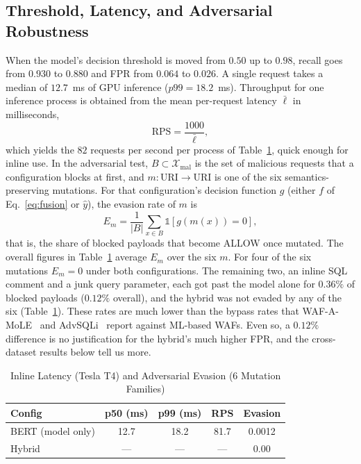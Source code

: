 \documentclass[conference]{IEEEtran}
\begin{document}
\subsection{Threshold, Latency, and Adversarial Robustness}
\label{sec:threshold}
When the model's decision threshold is moved from $0.50$ up to $0.98$,
recall goes from $0.930$ to $0.880$ and FPR from $0.064$ to $0.026$. A
single request takes a median of $12.7$~ms of GPU inference
($p99{=}18.2$~ms). Throughput for one inference process is obtained from
the mean per-request latency $\bar\ell$ in milliseconds,
\begin{equation}
\mathrm{RPS} = \frac{1000}{\bar\ell},
\label{eq:rps}
\end{equation}
which yields the $82$ requests per second per process of
Table~\ref{tab:latency}, quick enough for inline use. In the adversarial
test, $B\subset\mathcal{X}_{\text{mal}}$ is the set of malicious requests
that a configuration blocks at first, and $m:\text{URI}\to\text{URI}$ is
one of the six semantics-preserving mutations. For that configuration's
decision function $g$ (either $f$ of Eq.~\eqref{eq:fusion} or $\hat y$),
the evasion rate of $m$ is
\begin{equation}
E_m = \frac{1}{|B|}\sum_{x\in B} \mathbb{1}[g(m(x))=0],
\label{eq:evasion}
\end{equation}
that is, the share of blocked payloads that become ALLOW once mutated. The
overall figures in Table~\ref{tab:latency} average $E_m$ over the six $m$.
For four of the six mutations $E_m=0$ under both configurations. The remaining two, an inline SQL comment and a junk query
parameter, each got past the model alone for $0.36\%$ of blocked payloads
($0.12\%$ overall), and the hybrid was not evaded by any of the six
(Table~\ref{tab:latency}). These rates are much lower than the bypass rates
that WAF-A-MoLE~\cite{demetrio2020wafamole} and AdvSQLi~\cite{advsqli2024}
report against ML-based WAFs. Even so, a $0.12\%$ difference is no
justification for the hybrid's much higher FPR, and the cross-dataset
results below tell us more.

\begin{table}[t]
\centering
\caption{Inline Latency (Tesla T4) and Adversarial Evasion (6 Mutation Families)}
\label{tab:latency}
\begin{tabular}{@{}lcccc@{}}
\toprule
Config & p50 (ms) & p99 (ms) & RPS & Evasion \\
\midrule
BERT (model only) & 12.7 & 18.2 & 81.7 & 0.0012 \\
Hybrid & --- & --- & --- & 0.00 \\
\bottomrule
\end{tabular}
\end{table}
\end{document}
